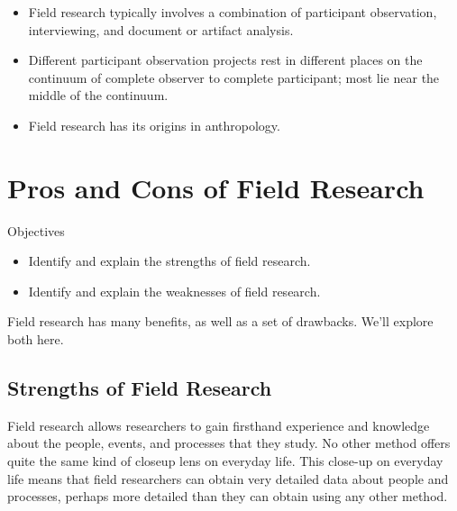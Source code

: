 \begin{itemize}
	\setlength{\itemsep}{0pt}
	\setlength{\parskip}{0pt}
	\setlength{\parsep}{0pt}
	
	\item Field research typically involves a combination of participant observation, interviewing, and document or artifact analysis.
	\item Different participant observation projects rest in different places on the continuum of complete observer to complete participant; most lie near the middle of the continuum.
	\item Field research has its origins in anthropology.	

\end{itemize}

\section{Pros and Cons of Field Research}

\begin{center}
	\begin{objbox}{Objectives}
		\begin{itemize}
			\setlength{\itemsep}{0pt}
			\setlength{\parskip}{0pt}
			\setlength{\parsep}{0pt}
			
			\item Identify and explain the strengths of field research.
			\item Identify and explain the weaknesses of field research.
			
		\end{itemize}
	\end{objbox}
\end{center}

Field research has many benefits, as well as a set of drawbacks. We’ll explore both here.

\subsection{Strengths of Field Research}

Field research allows researchers to gain firsthand experience and knowledge about the people, events, and processes that they study. No other method offers quite the same kind of closeup lens on everyday life. This close-up on everyday life means that field researchers can obtain very detailed data about people and processes, perhaps more detailed than they can obtain using any other method.

